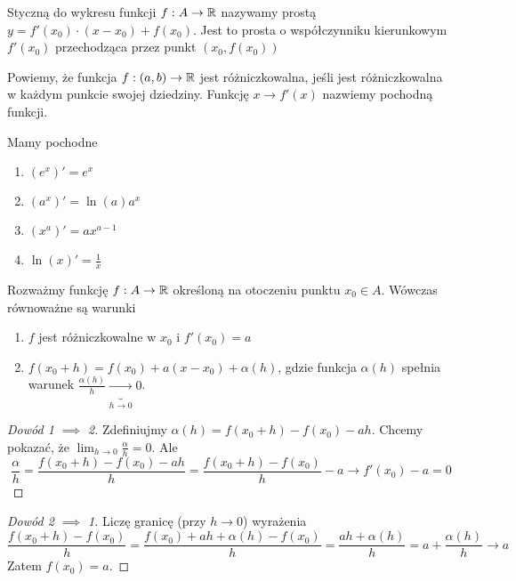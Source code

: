 \documentclass[9pt]{article}
\begin{document}
\begin{Def}
    Styczną do wykresu funkcji $f: A \to \mathbb{R}$ nazywamy prostą $y =f'(x_0) \cdot (x-x_0) + f(x_0)$.
    Jest to prosta o współczynniku kierunkowym $f'(x_0)$ przechodząca przez punkt $(x_0, f(x_0))$
\end{Def}

\begin{Def}
    Powiemy, że funkcja $f: (a,b) \to \mathbb{R}$ jest różniczkowalna, jeśli jest różniczkowalna w każdym
    punkcie swojej dziedziny. Funkcję $x \to f'(x)$ nazwiemy pochodną funkcji.
\end{Def}

\begin{Twi}
    Mamy pochodne
    \begin{enumerate}
        \item $\left(e^x\right)' = e^x$
        \item $\left(a^x\right)' = \ln(a) a^x$
        \item $\left(x^a\right)' = ax^{a-1}$
        \item $\ln(x)' = \frac{1}{x}$
    \end{enumerate}
\end{Twi}

\begin{Twi}
    Rozważmy funkcję $f: A \to \mathbb{R}$ określoną na otoczeniu punktu $x_0 \in A$. Wówczas równoważne są
    warunki
    \begin{enumerate}
        \item $f$ jest różniczkowalne w $x_0$ i $f'(x_0) = a$
        \item $f(x_0+h) = f(x_0) + a(x-x_0) + \alpha (h)$, gdzie funkcja $\alpha(h)$ spełnia warunek
            $\frac{\alpha(h)}{h} \underbrace{\to}_{h \to 0} 0$.
    \end{enumerate}
\end{Twi}

\begin{proof}[Dowód 1 $\implies$ 2]
    Zdefiniujmy $\alpha(h) = f(x_0+h) - f(x_0) - ah$. Chcemy pokazać, że
    $\lim_{h \to 0} \frac{\alpha}{h} = 0$. Ale
    \[
        \frac{\alpha}{h} = \frac{f(x_0+h)-f(x_0) - ah}{h} = \frac{f(x_0+h) - f(x_0)}{h} - a \to
        f'(x_0) - a = 0
    \]
\end{proof}

\begin{proof}[Dowód 2 $\implies$ 1]
    Liczę granicę (przy $h \to 0$) wyrażenia
    \[
        \frac{f(x_0+h)-f(x_0)}{h} =
        \frac{f(x_0)+ah+\alpha(h)-f(x_0)}{h} = \frac{ah+\alpha(h)}{h} = a + \frac{\alpha(h)}{h}
        \to a
    \]
    Zatem $f(x_0) = a$.
\end{proof}
\end{document}
